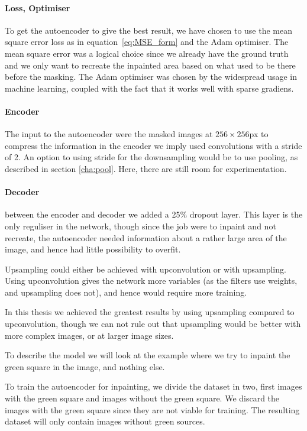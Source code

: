 \paragraph{Loss, Optimiser}
To get the autoencoder to give the best result, we have chosen to use the mean square error loss as in equation~\ref{eq:MSE_form} and the Adam\cite{adam} optimiser.
The mean square error was a logical choice since we already have the ground truth and we only want to recreate the inpainted area based on what used to be there before the masking.
The Adam optimiser was chosen by the widespread usage in machine learning, coupled with the fact that it works well with sparse gradiens.

\paragraph{Encoder}
The input to the autoencoder were the masked images at $256 \times 256$px to compress the information in the encoder we imply used convolutions with a stride of 2. An option to using stride for the downsampling would be to use pooling, as described in section \ref{cha:pool}. Here, there are still room for experimentation.



\paragraph{Decoder}
between the encoder and decoder we added a 25\% dropout layer. This layer is the only reguliser in the network, though since the job were to inpaint and not recreate, the autoencoder needed information about a rather large area of the image, and hence had little possibility to overfit.

Upsampling could either be achieved with upconvolution or with upsampling.
Using upconvolution gives the network more variables (as the filters use weights, and upsampling does not), and hence would require more training. 

In this thesis we achieved the greatest results by using upsampling compared to upconvolution, though we can not rule out that upsampling would be better with more complex images, or at larger image sizes.

\vspace{5px}

To describe the model we will look at the example where we try to inpaint the green square in the image, and nothing else.

To train the autoencoder for inpainting, we divide the dataset in two, first images with the green square and images without the green square. We discard the images with the green square since they are not viable for training. 
The resulting dataset will only contain images without green sources.

